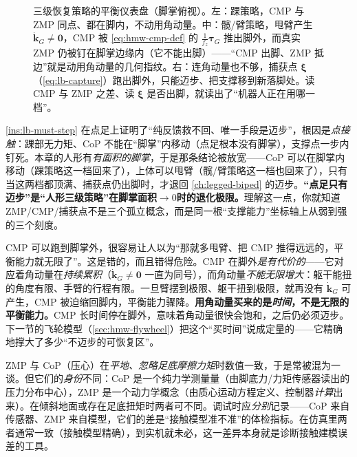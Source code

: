 \begin{figure}[ht]
\caption{三级恢复策略的平衡仪表盘（脚掌俯视）。左：踝策略，CMP 与 ZMP 同点、都在脚内，不动用角动量。中：髋/臂策略，甩臂产生 $\dot{\mathbf k}_G\ne\mathbf 0$，CMP 被 \cref{eq:hmw-cmp-def} 的 $\frac{1}{f_z}\boldsymbol\tau_G$ 推出脚外，而真实 ZMP 仍被钉在脚掌边缘内（它不能出脚）——“CMP 出脚、ZMP 抵边”就是动用角动量的几何指纹。右：连角动量也不够，捕获点 $\boldsymbol\xi$（\cref{eq:lb-capture}）跑出脚外，只能迈步、把支撑移到新落脚处。读 CMP 与 ZMP 之差、读 $\boldsymbol\xi$ 是否出脚，就读出了“机器人正在用哪一档”。}
\label{fig:hmw-three-points}
\end{figure}

\begin{insight}\label{ins:hmw-relax-stepping}
\cref{ins:lb-must-step} 在点足上证明了“纯反馈救不回、唯一手段是迈步”，根因是\emph{点接触}：踝部无力矩、CoP 不能在“脚掌”内移动（点足根本没有脚掌），支撑点一步内钉死。本章的人形有\emph{有面积的脚掌}，于是那条结论被放宽——CoP 可以在脚掌内移动（踝策略这一档回来了），上体可以甩臂（髋/臂策略这一档也回来了），只有当这两档都顶满、捕获点仍出脚时，才退回 \cref{ch:legged-biped} 的迈步。\textbf{“点足只有迈步”是“人形三级策略”在脚掌面积$\to 0$时的退化极限。}理解这一点，你就知道 ZMP/CMP/捕获点不是三个孤立概念，而是同一根“支撑能力”坐标轴上从弱到强的三个刻度。
\end{insight}

\begin{pitfall}\label{pit:hmw-cmp-saturation}
CMP 可以跑到脚掌外，很容易让人以为“那就多甩臂、把 CMP 推得远远的，平衡能力就无限了”。这是错的，而且错得危险。CMP 在脚外\emph{是有代价的}——它对应着角动量在\emph{持续累积}（$\dot{\mathbf k}_G\ne\mathbf 0$ 一直为同号），而角动量\emph{不能无限增大}：躯干能扭的角度有限、手臂的行程有限。一旦臂摆到极限、躯干扭到极限，就再没有 $\dot{\mathbf k}_G$ 可产生，CMP 被迫缩回脚内，平衡能力骤降。\textbf{用角动量买来的是\emph{时间}，不是无限的平衡能力。}CMP 长时间停在脚外，意味着角动量很快会饱和，之后仍必须迈步。下一节的飞轮模型（\cref{sec:hmw-flywheel}）把这个“买时间”说成定量的——它精确地撑大了多少“不迈步的可恢复区”。
\end{pitfall}

\begin{pitfall}\label{pit:hmw-zmp-cop}
ZMP 与 CoP（压心）在\emph{平地、忽略足底摩擦力矩}时数值一致，于是常被混为一谈。但它们的\emph{身份}不同：CoP 是一个纯力学测量量（由脚底力/力矩传感器读出的压力分布中心），ZMP 是一个动力学概念（由质心运动方程定义、控制器\emph{计算}出来）。在倾斜地面或存在足底扭矩时两者可不同。调试时应\emph{分别}记录——CoP 来自传感器、ZMP 来自模型，它们的差是“接触模型准不准”的体检指标。在仿真里两者通常一致（接触模型精确），到实机就未必，这一差异本身就是诊断接触建模误差的工具。
\end{pitfall}

